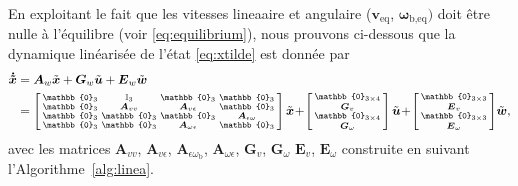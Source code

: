 En exploitant le fait que les vitesses lineaaire et angulaire ($\boldsymbol{v}_{\text{eq}}$, $\boldsymbol{\omega}_{\text{b,eq}})$ doit être nulle à l'équilibre (voir \eqref{eq:equilibrium}), nous prouvons ci-dessous que la dynamique linéarisée de l'état \eqref{eq:xtilde} est donnée par
\begin{align}
\label{eq:lpv_linearisation}
 \boldsymbol{\dot{\tilde{x}}} &= \boldsymbol{A}_{w} \tilde{\boldsymbol{x}} + \boldsymbol{G}_{w} \tilde{\boldsymbol{u}} + \boldsymbol{E}_{w}  \tilde{\boldsymbol{w}} \\
 &= \smallmat{
     \mathbb{0}_{3} & \mathbb{I}_{3} & \mathbb{0}_{3} &\mathbb{0}_{3} \\
    \mathbb{0}_{3} & \boldsymbol{A}_{vv}  & \boldsymbol{A}_{v\epsilon}  & \mathbb{0}_{3}\\
    \mathbb{0}_{3} & \mathbb{0}_{3} & \mathbb{0}_{3} & \boldsymbol{A}_{\epsilon \omega} \\    
    \mathbb{0}_{3} & \mathbb{0}_{3} &  \boldsymbol{A}_{\omega \epsilon} & \mathbb{0}_{3}
    } \tilde{\boldsymbol{x}} \!+\!
    \smallmat{ \mathbb{0}_{3 \times 4} \\
     \boldsymbol{G}_{v}\\
     \mathbb{0}_{3 \times 4}\\
     \boldsymbol{G}_{\omega}
    } \tilde{\boldsymbol{u}}
    \!+\! \smallmat{
     \mathbb{0}_{3 \times 3} \\
     \boldsymbol{E}_{v} \\
     \mathbb{0}_{3 \times 3} \\
     \boldsymbol{E}_{\omega} 
     } \!\tilde{\boldsymbol{w}},
     \nonumber
\end{align}
%
avec les matrices $\boldsymbol{A}_{vv} $, $\boldsymbol{A}_{v\epsilon}$, $\boldsymbol{A}_{\epsilon \omega_{\text{b}}}$, $\boldsymbol{A}_{\omega \epsilon}$, $ \boldsymbol{G}_{v}$, $\boldsymbol{G}_{\omega}$ $\boldsymbol{E}_{v}$, $\boldsymbol{E}_{\omega}$ construite en suivant l'Algorithme~\ref{alg:linea}.

